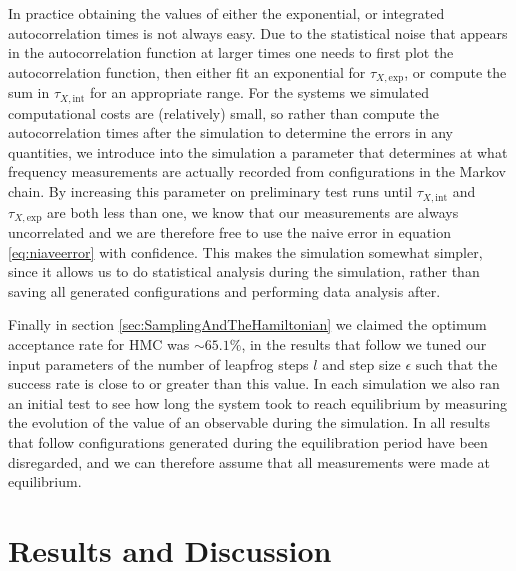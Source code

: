 \documentclass[12pt]{article}
\begin{document}
            In practice obtaining the values of either the exponential, or integrated autocorrelation times is not always easy. Due to the statistical noise that appears in the autocorrelation function at larger times one needs to first plot the autocorrelation function, then either fit an exponential for $\tau_{X,\text{exp}}$, or compute the sum in $\tau_{X,\text{int}}$ for an appropriate range. For the systems we simulated computational costs are (relatively) small, so rather than compute the autocorrelation times after the simulation to determine the errors in any quantities, we introduce into the simulation a parameter that determines at what frequency measurements are actually recorded from configurations in the Markov chain. By increasing this parameter on preliminary test runs until $\tau_{X,\text{int}}$ and $\tau_{X,\text{exp}}$ are both less than one, we know that our measurements are always uncorrelated and we are therefore free to use the naive error in equation \ref{eq:niaveerror} with confidence. This makes the simulation somewhat simpler, since it allows us to do statistical analysis during the simulation, rather than saving all generated configurations and performing data analysis after. 

            Finally in section \ref{sec:SamplingAndTheHamiltonian} we claimed the optimum acceptance rate for HMC was $\sim 65.1\%$, in the results that follow we tuned our input parameters of the number of leapfrog steps $l$ and step size $\epsilon$ such that the success rate is close to or greater than this value. In each simulation we also ran an initial test to see how long the system took to reach equilibrium by measuring the evolution of the value of an observable during the simulation. In all results that follow configurations generated during the equilibration period have been disregarded, and we can therefore assume that all measurements were made at equilibrium.

            
\section{Results and Discussion}
\end{document}
